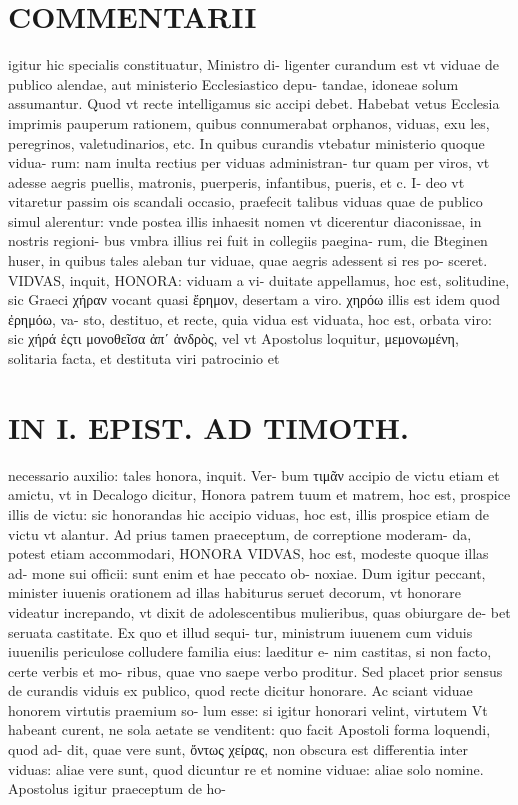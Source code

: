 \documentclass{article}
\begin{document}
\begin{pages}
\section*{COMMENTARII }
\marginpar{[ p.120 ]}\pstart igitur hic specialis constituatur, Ministro di- ligenter curandum est vt viduae de publico alendae, aut ministerio Ecclesiastico depu- tandae, idoneae solum assumantur. Quod vt recte intelligamus sic accipi debet. Habebat vetus Ecclesia imprimis pauperum rationem, quibus connumerabat orphanos, viduas, exu les, peregrinos, valetudinarios, etc. In quibus curandis vtebatur ministerio quoque vidua- rum: nam inulta rectius per viduas administran- tur quam per viros, vt adesse aegris puellis, matronis, puerperis, infantibus, pueris, et c. I- deo vt vitaretur passim ois scandali occasio, praefecit talibus viduas quae de publico simul alerentur: vnde postea illis inhaesit nomen vt dicerentur diaconissae, in nostris regioni- bus vmbra illius rei fuit in collegiis paegina- rum, die Bteginen huser, in quibus tales aleban tur viduae, quae aegris adessent si res po- sceret.  \pend\pstart VIDVAS, inquit, HONORA: viduam a vi- duitate appellamus, hoc est, solitudine, sic Graeci χήραν vocant quasi ἔρημον, desertam a viro. χηρόω illis est idem quod ἐρημόω, va- sto, destituo, et recte, quia vidua est viduata, hoc est, orbata viro: sic χήρά ἑςτι  μονοθεῖσα ἀπʹ ἀνδρὸς, vel vt Apostolus loquitur, μεμονωμένη, solitaria facta, et destituta viri patrocinio et  \pend
\section*{IN I. EPIST. AD TIMOTH. }
\marginpar{[ p.121 ]}\pstart necessario auxilio: tales honora, inquit. Ver- bum τιμᾶν accipio de victu etiam et amictu, vt in Decalogo dicitur, Honora patrem tuum et matrem, hoc est, prospice illis de victu: sic honorandas hic accipio viduas, hoc est, illis prospice etiam de victu vt alantur. Ad prius tamen praeceptum, de correptione moderam- da, potest etiam accommodari, HONORA VIDVAS, hoc est, modeste quoque illas ad- mone sui officii: sunt enim et hae peccato ob- noxiae. Dum igitur peccant, minister iuuenis orationem ad illas habiturus seruet decorum, vt honorare videatur increpando, vt dixit de adolescentibus mulieribus, quas obiurgare de- bet seruata castitate. Ex quo et illud sequi- tur, ministrum iuuenem cum viduis iuuenilis periculose colludere familia eius: laeditur e- nim castitas, si non facto, certe verbis et mo- ribus, quae vno saepe verbo proditur.  \pend\pstart Sed placet prior sensus de curandis viduis ex publico, quod recte dicitur honorare. Ac sciant viduae honorem virtutis praemium so- lum esse: si igitur honorari velint, virtutem Vt habeant curent, ne sola aetate se venditent: quo facit Apostoli forma loquendi, quod ad- dit, quae vere sunt, ὄντως χείρας, non obscura est differentia inter viduas: aliae vere sunt, quod dicuntur re et nomine viduae: aliae solo nomine. Apostolus igitur praeceptum de ho-  \pend

\end{pages}
\end{document}
